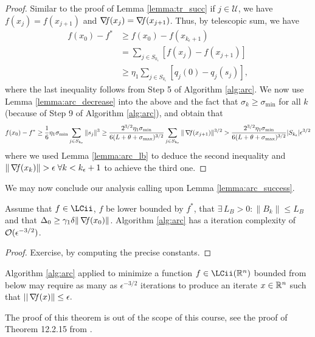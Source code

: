 \documentclass[10pt,a4paper]{article}
\begin{document}
\begin{proof}
	Similar to the proof of Lemma \ref{lemma:tr_succ} if $j\in \mathcal{U}$, we have $f(x_j) = f(x_{j+1})$ and $\operatorname*{\mathit{\nabla \!f}}(x_j)=\operatorname*{\mathit{\nabla \!f}}(x_{j+1})$. Thus, by telescopic sum, we have 
\begin{align*}
	f(x_0) - f^* &\geq f(x_0) - f(x_{k_\epsilon+1}) \\
	&= \sum_{j \in S_{k_\epsilon}} [f(x_j) - f(x_{j+1})] \\
	&\geq \eta_1 \sum_{j \in S_{k_\epsilon}} [q_j(0) - q_j(s_j)],
\end{align*}
where the last inequality follows from Step 5 of Algorithm \ref{alg:arc}. We now use Lemma \ref{lemma:arc_decrease} into the above and the fact that $\sigma_k \geq \sigma_{\min}$ for all $k$ (because of Step 9 of Algorithm \ref{alg:arc}), and obtain that
\begin{equation*}
	f(x_0) - f^* \geq \frac{1}{6}\eta_1 \sigma_{\min} \sum_{j \in S_{k_\epsilon}} \|s_j\|^3 \geq \frac{2^{3/2} \eta_1 \sigma_{\min}}{6(L + \theta + \sigma_{\max})^{3/2}} \sum_{j \in S_{k_\epsilon}} \|\operatorname*{\mathit{\nabla \!f}}(x_{j+1})\|^{3/2}> \frac{2^{3/2} \eta_1 \sigma_{\min}}{6(L + \theta + \sigma_{\max})^{3/2}} |S_{k_\epsilon}| \epsilon^{3/2}
\end{equation*}
where we used Lemma \ref{lemma:arc_lb} to deduce the second inequality and $\|\grad(x_k)\|>\epsilon \; \forall k<k_\epsilon+1$ to achieve the third one.
\end{proof}

\noindent We may now conclude our analysis calling upon Lemma \ref{lemma:arc_success}.
\begin{theorem}
	Assume that $f\in \LCii$, $f$ be lower bounded by $f^*$, that $\exists\, L_B>0: \|B_k\| \leq L_B$ and that $\Delta_0\geq \gamma_1 \delta \|\operatorname*{\mathit{\nabla \!f}}(x_0)\|$. Algorithm \ref{alg:arc} has a iteration complexity of $\mathcal{O}(\epsilon^{-3/2})$.
\end{theorem}
\begin{proof}
	Exercise, by computing the precise constants.
\end{proof}

\begin{theorem}
	Algorithm \ref{alg:arc} applied to minimize a function $f\in \LCii(\Rn)$ bounded from below may require as many as $\epsilon^{-3/2}$ iterations to produce an iterate $x\in \mathbb{R}^n$ such that $||\operatorname*{\mathit{\nabla \!f}} (x)\|\leq \epsilon.$
\end{theorem}
\noindent The proof of this theorem is out of the scope of this course, see the proof of Theorem 12.2.15 from \cite{cartis22a}.
\end{document}
